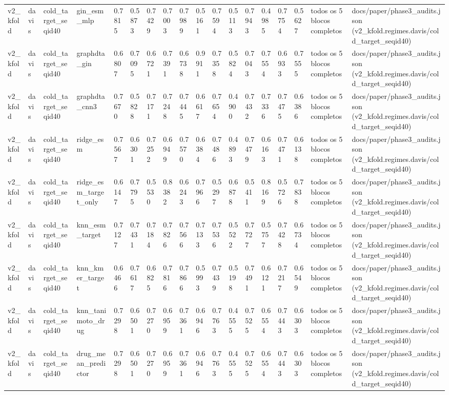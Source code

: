 \begin{table}[htbp]
\begin{tabular}{llllllllllllllllll}
v2\_kfold & davis & cold\_target\_seqid40 & gin\_esm\_mlp & 0.7815 & 0.5873 & 0.7429 & 0.7003 & 0.7989 & 0.5161 & 0.7594 & 0.5113 & 0.7943 & 0.4985 & 0.7754 & 0.5627 & todos os 5 blocos completos & docs/paper/phase3\_audits.json (v2\_kfold.regimes.davis/cold\_target\_seqid40) \\
v2\_kfold & davis & cold\_target\_seqid40 & graphdta\_gin & 0.6807 & 0.7095 & 0.6721 & 0.7391 & 0.6738 & 0.9911 & 0.7358 & 0.5824 & 0.7043 & 0.7554 & 0.6933 & 0.7555 & todos os 5 blocos completos & docs/paper/phase3\_audits.json (v2\_kfold.regimes.davis/cold\_target\_seqid40) \\
v2\_kfold & davis & cold\_target\_seqid40 & graphdta\_cnn3 & 0.7670 & 0.5828 & 0.7171 & 0.7248 & 0.7445 & 0.6617 & 0.7654 & 0.4900 & 0.7432 & 0.7336 & 0.7475 & 0.6386 & todos os 5 blocos completos & docs/paper/phase3\_audits.json (v2\_kfold.regimes.davis/cold\_target\_seqid40) \\
v2\_kfold & davis & cold\_target\_seqid40 & ridge\_esm & 0.7567 & 0.6301 & 0.7252 & 0.6949 & 0.7570 & 0.6384 & 0.7486 & 0.4893 & 0.7479 & 0.6163 & 0.7471 & 0.6138 & todos os 5 blocos completos & docs/paper/phase3\_audits.json (v2\_kfold.regimes.davis/cold\_target\_seqid40) \\
v2\_kfold & davis & cold\_target\_seqid40 & ridge\_esm\_target\_only & 0.6147 & 0.7795 & 0.5530 & 0.8382 & 0.6243 & 0.7966 & 0.5297 & 0.6878 & 0.5411 & 0.8169 & 0.5726 & 0.7838 & todos os 5 blocos completos & docs/paper/phase3\_audits.json (v2\_kfold.regimes.davis/cold\_target\_seqid40) \\
v2\_kfold & davis & cold\_target\_seqid40 & knn\_esm\_target & 0.7127 & 0.7431 & 0.7184 & 0.7826 & 0.7566 & 0.7133 & 0.7536 & 0.5522 & 0.7727 & 0.5757 & 0.7428 & 0.6734 & todos os 5 blocos completos & docs/paper/phase3\_audits.json (v2\_kfold.regimes.davis/cold\_target\_seqid40) \\
v2\_kfold & davis & cold\_target\_seqid40 & knn\_kmer\_target & 0.6466 & 0.7617 & 0.6825 & 0.7816 & 0.7866 & 0.5993 & 0.7439 & 0.5198 & 0.7491 & 0.6121 & 0.7217 & 0.6549 & todos os 5 blocos completos & docs/paper/phase3\_audits.json (v2\_kfold.regimes.davis/cold\_target\_seqid40) \\
v2\_kfold & davis & cold\_target\_seqid40 & knn\_tanimoto\_drug & 0.7298 & 0.6501 & 0.7270 & 0.6959 & 0.7361 & 0.6946 & 0.7763 & 0.4555 & 0.7525 & 0.6554 & 0.7443 & 0.6303 & todos os 5 blocos completos & docs/paper/phase3\_audits.json (v2\_kfold.regimes.davis/cold\_target\_seqid40) \\
v2\_kfold & davis & cold\_target\_seqid40 & drug\_mean\_predictor & 0.7298 & 0.6501 & 0.7270 & 0.6959 & 0.7361 & 0.6946 & 0.7763 & 0.4555 & 0.7525 & 0.6554 & 0.7443 & 0.6303 & todos os 5 blocos completos & docs/paper/phase3\_audits.json (v2\_kfold.regimes.davis/cold\_target\_seqid40) \\

\end{tabular}
\end{table}
